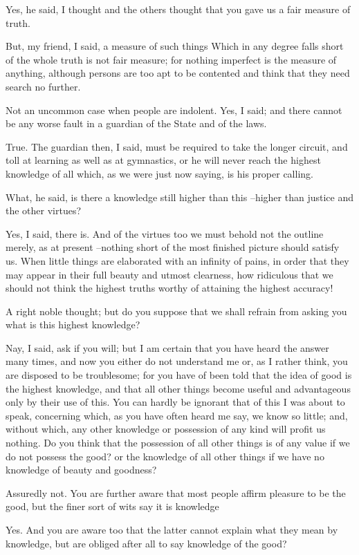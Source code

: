 Yes, he said, I thought and the others thought that you gave us a fair measure of truth.

But, my friend, I said, a measure of such things Which in any degree falls short of the whole truth is not fair measure; for nothing imperfect is the measure of anything, although persons are too apt to be contented and think that they need search no further.

Not an uncommon case when people are indolent.
Yes, I said; and there cannot be any worse fault in a guardian of the State and of the laws.

True.
The guardian then, I said, must be required to take the longer circuit, and toll at learning as well as at gymnastics, or he will never reach the highest knowledge of all which, as we were just now saying, is his proper calling.

What, he said, is there a knowledge still higher than this --higher than justice and the other virtues?

Yes, I said, there is. And of the virtues too we must behold not the outline merely, as at present --nothing short of the most finished picture should satisfy us. When little things are elaborated with an infinity of pains, in order that they may appear in their full beauty and utmost clearness, how ridiculous that we should not think the highest truths worthy of attaining the highest accuracy!

A right noble thought; but do you suppose that we shall refrain from asking you what is this highest knowledge?

Nay, I said, ask if you will; but I am certain that you have heard the answer many times, and now you either do not understand me or, as I rather think, you are disposed to be troublesome; for you have of been told that the idea of good is the highest knowledge, and that all other things become useful and advantageous only by their use of this. You can hardly be ignorant that of this I was about to speak, concerning which, as you have often heard me say, we know so little; and, without which, any other knowledge or possession of any kind will profit us nothing. Do you think that the possession of all other things is of any value if we do not possess the good? or the knowledge of all other things if we have no knowledge of beauty and goodness?

Assuredly not.
You are further aware that most people affirm pleasure to be the good, but the finer sort of wits say it is knowledge

Yes.
And you are aware too that the latter cannot explain what they mean by knowledge, but are obliged after all to say knowledge of the good?

